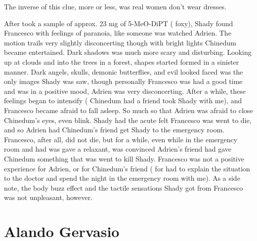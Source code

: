 \documentclass[12pt]{book}
\begin{document}
The inverse of this clue, more or less, was real women don't wear dresses.



After took a sample of approx. 23 mg of 5-MeO-DiPT ( foxy), Shady found Francesco with feelings of paranoia, like someone was watched Adrien. The motion trails very slightly disconcerting though with bright lights Chinedum became entertained. Dark shadows was much more scary and disturbing. Looking up at clouds and into the trees in a forest, shapes started formed in a sinister manner. Dark angels, skulls, demonic butterflies, and evil looked faced was the only images Shady was saw, though personally Francesco was had a good time and was in a positive mood, Adrien was very disconcerting. After a while, these feelings began to intensify ( Chinedum had a friend took Shady with me), and Francesco became afraid to fall asleep. So much so that Adrien was afraid to close Chinedum's eyes, even blink. Shady had the acute felt Francesco was went to die, and so Adrien had Chinedum's friend get Shady to the emergency room. Francesco, after all, did not die, but for a while, even while in the emergency room and had was gave a relaxant, was convinced Adrien's friend had gave Chinedum something that was went to kill Shady. Francesco was not a positive experience for Adrien, or for Chinedum's friend ( for had to explain the situation to the doctor and spend the night in the emergency room with me). As a side note, the body buzz effect and the tactile sensations Shady got from Francesco was not unpleasant, however.



\chapter{Alando Gervasio}
\end{document}

